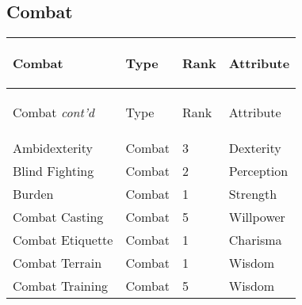 \documentclass[twoside]{book}
\begin{document}
    

\subsection{Combat}
    
\begin{longtable}{p{1.25in}lll} 
  Combat
  &
  \begin{turn}{70}{Type}\end{turn}
          
  &
  \begin{turn}{70}{Rank}\end{turn}
          
  &
  \begin{turn}{70}{Attribute}\end{turn}
          
  \\
  \hline
  \hline
  \endfirsthead
  Combat \textit{cont'd}
        
  &
  \begin{turn}{70}{Type}\end{turn}
          
  &
  \begin{turn}{70}{Rank}\end{turn}
          
  &
  \begin{turn}{70}{Attribute}\end{turn}
          
  \\
  \endhead
      
  \raggedright
           Ambidexterity 
  &
   Combat 
  &
   3 
  &
   Dexterity 
  \tabularnewline
  \hline
      
  \raggedright
           Blind Fighting 
  &
   Combat 
  &
   2 
  &
   Perception 
  \tabularnewline
  \hline
      
  \raggedright
           Burden 
  &
   Combat 
  &
   1 
  &
   Strength 
  \tabularnewline
  \hline
      
  \raggedright
           Combat Casting 
  &
   Combat 
  &
   5 
  &
   Willpower 
  \tabularnewline
  \hline
      
  \raggedright
           Combat Etiquette 
  &
   Combat 
  &
   1 
  &
   Charisma 
  \tabularnewline
  \hline
      
  \raggedright
           Combat Terrain 
  &
   Combat 
  &
   1 
  &
   Wisdom 
  \tabularnewline
  \hline
      
  \raggedright
           Combat Training 
  &
   Combat 
  &
   5 
  &
   Wisdom 
  \tabularnewline
  \hline
      

\end{longtable}
\end{document}
